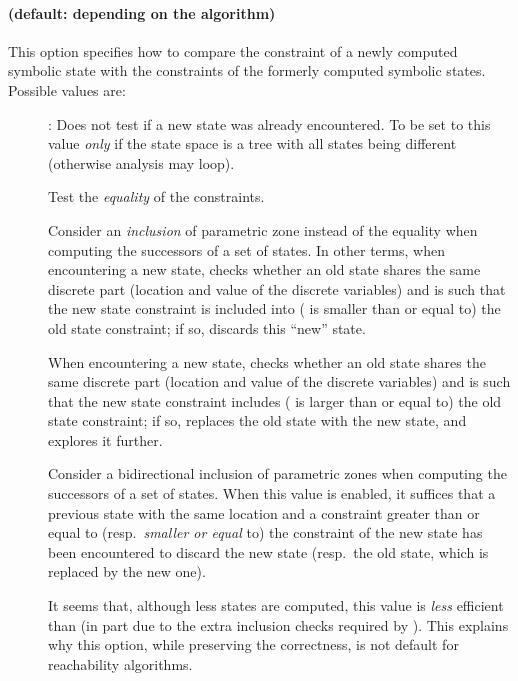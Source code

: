 \paragraph{ (default: depending on the algorithm)}
This option specifies how to compare the constraint of a newly computed symbolic state with the constraints of the formerly computed symbolic states.
Possible values are:
\begin{description}
	\item[]:
	Does not test if a new state was already encountered.
To be set to this value \emph{only} if the state space is a tree with all states being different (otherwise analysis may loop).

	\item[]
	Test the \emph{equality} of the constraints.

	\item[]
Consider an \emph{inclusion} of parametric zone instead of the equality when computing the successors of a set of states.
In other terms, when encountering a new state, \imitator{} checks whether an old state shares the same discrete part (location and value of the discrete variables) and is such that the new state constraint is included into (\ie{} is smaller than or equal to) the old state constraint; if so, \imitator{} discards this ``new'' state.

	\item[]
When encountering a new state, \imitator{} checks whether an old state shares the same discrete part (location and value of the discrete variables) and is such that the new state constraint includes (\ie{} is larger than or equal to) the old state constraint; if so, \imitator{} replaces the old state with the new state, and explores it further.

	\item[]
Consider a bidirectional inclusion of parametric zones when computing the successors of a set of states.
When this value is enabled, it suffices that a previous state with the same location and a constraint greater than or equal to (resp.\ \emph{smaller or equal} to) the constraint of the new state has been encountered to discard the new state (resp.\ the old state, which is replaced by the new one).

It seems that, although less states are computed, this value is \emph{less} efficient than  (in part due to the extra inclusion checks required by ).
This explains why this option, while preserving the correctness, is not default for reachability algorithms.
\end{description}

